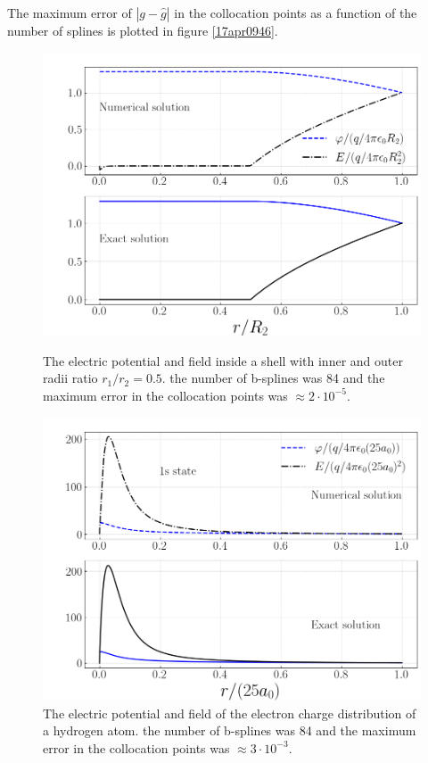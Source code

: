 \documentclass[twocolumn]{article}
\begin{document}
\begin{large}
The maximum error of $|g-\hat{g}|$ in the collocation points as a function of the number of splines is plotted in figure \ref{17apr0946}.
\begin{figure}[b!]
    \includegraphics[scale=0.35]{shell_ephi.png}
    \caption{The electric potential and field inside a shell with inner and outer radii ratio $r_1/r_2=0.5$. the number of b-splines was 84 and the maximum error in the collocation points was $\approx 2\cdot 10^{-5}$.}
    \label{17apr0950}
    \includegraphics[scale=0.35]{hydrogen_ephi.png}
    \caption{The electric potential and field of the electron charge distribution of a hydrogen atom. the number of b-splines was 84 and the maximum error in the collocation points was $\approx 3\cdot 10^{-3}$.}

\end{figure}
\end{large}
\end{document}
